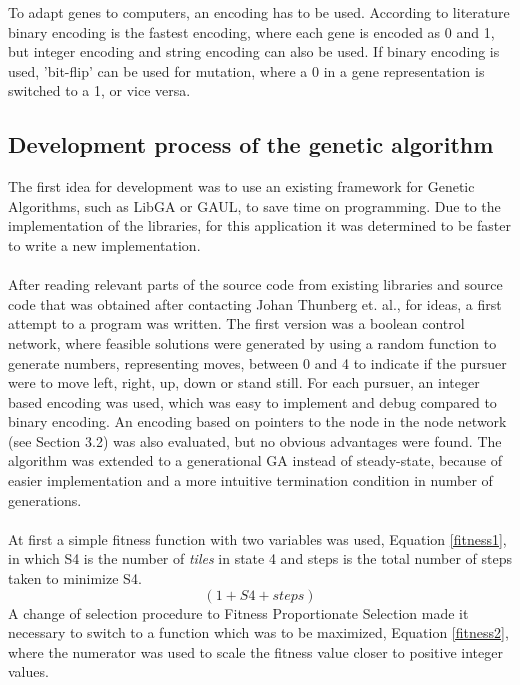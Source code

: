 To adapt genes to computers, an encoding has to be used.  According to literature \cite{GAHandbook1} binary encoding is the fastest encoding, where each gene is encoded as 0 and 1, but integer encoding and string encoding can also be used. If binary encoding is used, 'bit-flip' can be used for mutation, where a 0 in a gene representation is switched to a 1, or vice versa.
\subsection{Development process of the genetic algorithm}\label{geneticdevelopment}
The first idea for development was to use an existing framework for Genetic Algorithms, such as LibGA \cite{libGA} %
or GAUL\cite{GAUL}, to save time on programming. Due to the implementation of the libraries, for this application it was determined to be faster to write a new implementation.\\\\
%
After reading relevant parts of the source code from existing libraries and source code that was obtained after contacting Johan Thunberg et. al., for ideas, a first attempt to a program was written. The first version was a boolean control network, where feasible solutions were generated by using a random function to generate numbers, representing moves, between 0 and 4 to indicate if the pursuer were to move left, right, up, down or stand still. For each pursuer, an integer based encoding was used, which was easy to implement and debug compared to binary encoding. An encoding based on pointers to the node in the node network (see Section 3.2) was also evaluated, but no obvious advantages were found. The algorithm was extended to a generational GA instead of steady-state, because of easier implementation and a more intuitive termination condition in number of generations.\\\\
At first a simple fitness function with two variables was used, Equation \eqref{fitness1}, in which S4 is the number of \emph{tiles} in state 4 and steps is the total number of steps taken to minimize S4.
%
\begin{equation}\label{fitness1} (1+S4+steps) \end{equation}
%
A change of selection procedure to Fitness Proportionate Selection made it necessary to switch to a function which was to be maximized, Equation \eqref{fitness2}, where the numerator was used to scale the fitness value closer to positive integer values.
